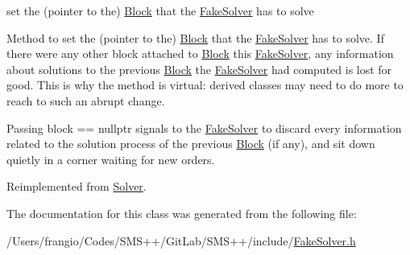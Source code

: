 set the (pointer to the) \mbox{\hyperlink{class_s_m_spp__di__unipi__it_1_1_block}{Block}} that the \mbox{\hyperlink{class_s_m_spp__di__unipi__it_1_1_fake_solver}{Fake\+Solver}} has to solve 

Method to set the (pointer to the) \mbox{\hyperlink{class_s_m_spp__di__unipi__it_1_1_block}{Block}} that the \mbox{\hyperlink{class_s_m_spp__di__unipi__it_1_1_fake_solver}{Fake\+Solver}} has to solve. If there were any other block attached to \mbox{\hyperlink{class_s_m_spp__di__unipi__it_1_1_block}{Block}} this \mbox{\hyperlink{class_s_m_spp__di__unipi__it_1_1_fake_solver}{Fake\+Solver}}, any information about solutions to the previous \mbox{\hyperlink{class_s_m_spp__di__unipi__it_1_1_block}{Block}} the \mbox{\hyperlink{class_s_m_spp__di__unipi__it_1_1_fake_solver}{Fake\+Solver}} had computed is lost for good. This is why the method is virtual\+: derived classes may need to do more to reach to such an abrupt change.

Passing block == nullptr signals to the \mbox{\hyperlink{class_s_m_spp__di__unipi__it_1_1_fake_solver}{Fake\+Solver}} to discard every information related to the solution process of the previous \mbox{\hyperlink{class_s_m_spp__di__unipi__it_1_1_block}{Block}} (if any), and sit down quietly in a corner waiting for new orders. 

Reimplemented from \mbox{\hyperlink{class_s_m_spp__di__unipi__it_1_1_solver_a73965be2cfab47947f0166116bf4a3cc}{Solver}}.



The documentation for this class was generated from the following file\+:\begin{DoxyCompactItemize}
\item 
/\+Users/frangio/\+Codes/\+S\+M\+S++/\+Git\+Lab/\+S\+M\+S++/include/\mbox{\hyperlink{_fake_solver_8h}{Fake\+Solver.\+h}}\end{DoxyCompactItemize}
